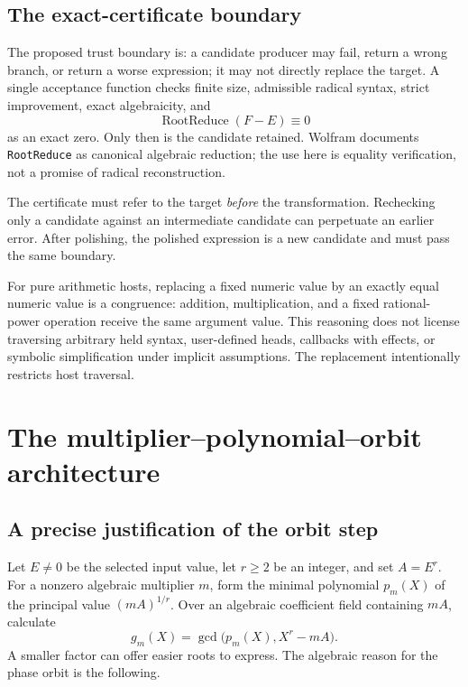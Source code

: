 \documentclass[11pt,letterpaper]{article}
\newcommand{\code}[1]{\texttt{#1}}
\theoremstyle{definition}
\begin{document}
\subsection{The exact-certificate boundary}

The proposed trust boundary is: a candidate producer may fail, return a wrong branch, or return a worse expression; it may not directly replace the target. A single acceptance function checks finite size, admissible radical syntax, strict improvement, exact algebraicity, and
\begin{equation}\label{eq:cert}
 \operatorname{RootReduce}(F-E)\equiv 0
\end{equation}
as an exact zero. Only then is the candidate retained. Wolfram documents \code{RootReduce} as canonical algebraic reduction; the use here is equality verification, not a promise of radical reconstruction.\cite{rootreduce}

The certificate must refer to the target \emph{before} the transformation. Rechecking only a candidate against an intermediate candidate can perpetuate an earlier error. After polishing, the polished expression is a new candidate and must pass the same boundary.

For pure arithmetic hosts, replacing a fixed numeric value by an exactly equal numeric value is a congruence: addition, multiplication, and a fixed rational-power operation receive the same argument value. This reasoning does not license traversing arbitrary held syntax, user-defined heads, callbacks with effects, or symbolic simplification under implicit assumptions. The replacement intentionally restricts host traversal.

\section{The multiplier--polynomial--orbit architecture}\label{sec:architecture}

\subsection{A precise justification of the orbit step}

Let $E\ne0$ be the selected input value, let $r\ge2$ be an integer, and set $A=E^r$. For a nonzero algebraic multiplier $m$, form the minimal polynomial $p_m(X)$ of the principal value $(mA)^{1/r}$. Over an algebraic coefficient field containing $mA$, calculate
\[
 g_m(X)=\gcd\bigl(p_m(X),X^r-mA\bigr).
\]
A smaller factor can offer easier roots to express. The algebraic reason for the phase orbit is the following.
\end{document}
